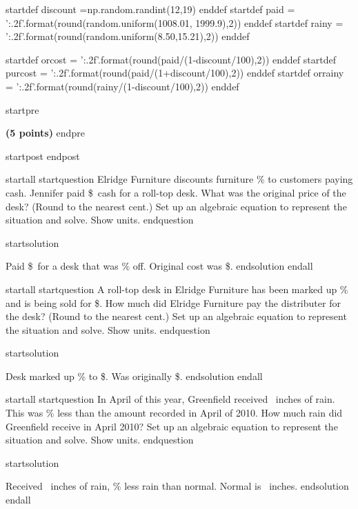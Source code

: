 startdef discount =np.random.randint(12,19) enddef 
startdef paid = '{:.2f}'.format(round(random.uniform(1008.01, 1999.9),2)) enddef
startdef rainy = '{:.2f}'.format(round(random.uniform(8.50,15.21),2)) enddef

startdef orcost = '{:.2f}'.format(round(paid/(1-discount/100),2)) enddef
startdef purcost = '{:.2f}'.format(round(paid/(1+discount/100),2)) enddef
startdef orrainy = '{:.2f}'.format(round(rainy/(1-discount/100),2)) enddef


startpre \item {\bf (5 points)} endpre

startpost
\vfill 
endpost


startall
startquestion Elridge Furniture discounts furniture \discount\% to customers paying cash. Jennifer paid \$\paid\ cash for a roll-top desk. What was the original price of the desk? (Round to the nearest cent.) Set up an algebraic equation to represent the situation and solve. Show units.
endquestion 

startsolution
\item Paid \$\paid\ for a desk that was \discount\% off. Original cost was \$\orcost. 
endsolution
endall


startall
startquestion A roll-top desk in Elridge Furniture has been marked up \discount\% and is being sold for \$\paid. How much did Elridge Furniture pay the distributer for the desk? (Round to the nearest cent.) Set up an algebraic equation to represent the situation and solve. Show units.
endquestion 

startsolution
\item Desk marked up \discount\% to \$\paid. Was originally \$\purcost. 
endsolution
endall


startall
startquestion In April of this year, Greenfield received \rainy\ inches of rain. This was \discount\% less than the amount recorded in April of 2010. How much rain did Greenfield  receive in April 2010? Set up an algebraic equation to represent the situation and solve. Show units.
endquestion 

startsolution
\item Received \rainy\ inches of rain, \discount\% less rain than normal. Normal is \orrainy\ inches.
endsolution
endall
